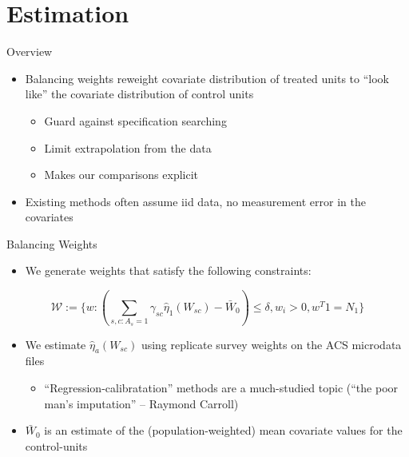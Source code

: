 \documentclass[hyperref={pdfpagelabels=false}]{beamer}
\begin{document}
\section{Estimation}

\begin{frame}{Overview}
    \begin{itemize}
        \item Balancing weights reweight covariate distribution of treated units to ``look like'' the covariate distribution of control units \bigskip
        \begin{itemize}
            \item Guard against specification searching \bigskip
            \item Limit extrapolation from the data \bigskip
            \item Makes our comparisons explicit \bigskip
        \end{itemize}
        \item Existing methods often assume iid data, no measurement error in the covariates
    \end{itemize}
\end{frame}

\begin{frame}{Balancing Weights}
    \begin{itemize}
        \item We generate weights that satisfy the following constraints:
    \end{itemize}
    
    $$
    \mathcal{W}:= \{w: (\sum_{s,c: A_s = 1}\gamma_{sc}\hat{\eta}_1(W_{sc}) - \bar{W}_0) \le \delta, w_i > 0, w^T1 = N_1\}
    $$
    
    \begin{itemize}
        \item We estimate $\hat{\eta}_a(W_{sc})$ using replicate survey weights on the ACS microdata files \bigskip
        \begin{itemize}
            \item ``Regression-calibratation'' methods are a much-studied topic (``the poor man's imputation'' -- Raymond Carroll) \bigskip
        \end{itemize}
        \item $\bar{W}_0$ is an estimate of the (population-weighted) mean covariate values for the control-units
    \end{itemize}
\end{frame}
\end{document}
